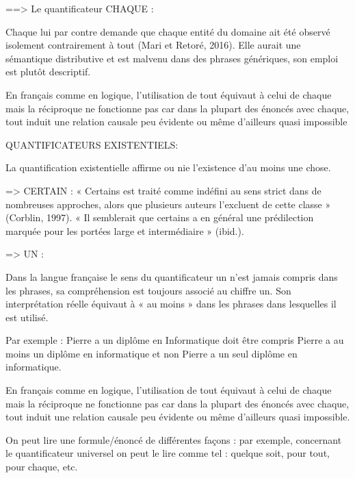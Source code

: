 \documentclass[11pt,letterpaper]{article}
\begin{document}
\par ==>  Le quantificateur CHAQUE :
\par Chaque lui par contre demande que chaque entité du domaine ait été observé isolement
contrairement à tout (Mari et Retoré, 2016). Elle aurait une sémantique distributive et est malvenu dans des phrases génériques, son emploi est plutôt descriptif.

\par
En français comme en logique, l’utilisation de tout équivaut à celui de chaque mais la réciproque ne fonctionne pas car dans la plupart des énoncés avec chaque, tout induit une relation causale peu évidente ou même d’ailleurs quasi impossible



\vspace{5mm}
QUANTIFICATEURS EXISTENTIELS:
\par La quantification existentielle affirme ou nie l’existence d’au moins une chose.

\par => CERTAIN :
« Certains est traité comme indéfini au sens strict dans de nombreuses approches, alors que
plusieurs auteurs l’excluent de cette classe » (Corblin, 1997). 
« Il semblerait que certains a en général une prédilection marquée pour les portées large et intermédiaire » (ibid.).

\par => UN :

\par Dans la langue française le sens du quantificateur un n’est jamais compris dans les phrases, sa compréhension est toujours associé au chiffre un. Son interprétation réelle équivaut à « au moins » dans les phrases dans lesquelles il est utilisé.
\par 
Par exemple :
Pierre a un diplôme en Informatique doit être compris Pierre a au moins un diplôme en informatique
et non Pierre a un seul diplôme en informatique.






En français comme en logique, l’utilisation de tout équivaut à celui de chaque mais la réciproque
ne fonctionne pas car dans la plupart des énoncés avec chaque, tout induit une relation causale peu
évidente ou même d’ailleurs quasi impossible.

\vspace{5mm}
\par On peut lire une formule/énoncé de différentes                             %
façons :                                                                        %
par exemple, concernant le quantificateur universel on peut le lire comme tel : %
quelque soit, pour tout, pour chaque, etc.                                      %
\end{document}
